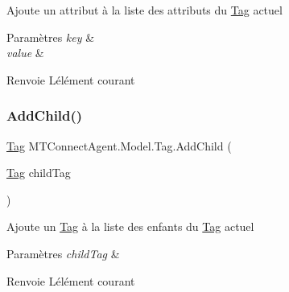 Ajoute un attribut à la liste des attributs du \mbox{\hyperlink{class_m_t_connect_agent_1_1_model_1_1_tag}{Tag}} actuel 


\begin{DoxyParams}{Paramètres}
{\em key} & \\
\hline
{\em value} & \\
\hline
\end{DoxyParams}
\begin{DoxyReturn}{Renvoie}
L\textquotesingle{}élément courant
\end{DoxyReturn}
\mbox{\label{class_m_t_connect_agent_1_1_model_1_1_tag_a74c01a8e302f87b611980b583e58b8c3}} 
\subsubsection{\texorpdfstring{Add\+Child()}{AddChild()}}
{\footnotesize\ttfamily \mbox{\hyperlink{class_m_t_connect_agent_1_1_model_1_1_tag}{Tag}} M\+T\+Connect\+Agent.\+Model.\+Tag.\+Add\+Child (\begin{DoxyParamCaption}\item[{\mbox{\hyperlink{class_m_t_connect_agent_1_1_model_1_1_tag}{Tag}}}]{child\+Tag }\end{DoxyParamCaption})\hspace{0.3cm}{\ttfamily [inline]}}



Ajoute un \mbox{\hyperlink{class_m_t_connect_agent_1_1_model_1_1_tag}{Tag}} à la liste des enfants du \mbox{\hyperlink{class_m_t_connect_agent_1_1_model_1_1_tag}{Tag}} actuel 


\begin{DoxyParams}{Paramètres}
{\em child\+Tag} & \\
\hline
\end{DoxyParams}
\begin{DoxyReturn}{Renvoie}
L\textquotesingle{}élément courant
\end{DoxyReturn}
\mbox{\label{class_m_t_connect_agent_1_1_model_1_1_tag_aa8b2a0cdde372d0807a65c4e2f8d6eb3}} 
